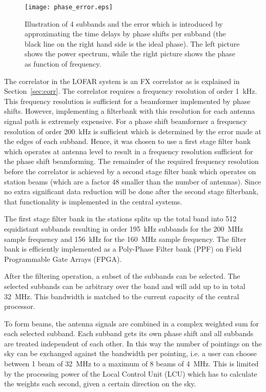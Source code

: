 \documentclass[journal]{IEEEtran}
\begin{document}
\begin{figure}
\begin{center}
\texttt{[image: phase\_error.eps]}
\end{center}
\caption{Illustration of 4 subbands and the error which is introduced by approximating the time delays by phase shifts per subband (the black line on the right hand side is the ideal phase). The left picture shows the power spectrum, while the right picture shows the phase as function of frequency.}
\label{fig:phasebeamf}
\end{figure}

The correlator in the LOFAR system is an FX correlator as is explained in Section~\ref{sec:corr}. The correlator requires a frequency resolution of order 1~kHz. This frequency resolution is sufficient for a beamformer implemented by phase shifts. However, implementing a filterbank with this resolution for each antenna signal path is extremely expensive. For a phase shift beamformer a frequency resolution of order 200~kHz is sufficient which is determined by the error made at the edges of each subband. Hence, it was chosen to use a first stage filter bank which operates at antenna level to result in a frequency resolution sufficient for the phase shift beamforming. The remainder of the required frequency resolution before the correlator is achieved by a second stage filter bank which operates on station beams (which are a factor 48 smaller than the number of antennas). Since no extra significant data reduction will be done after the second stage filterbank, that functionality is implemented in the central systems.

The first stage filter bank in the stations splits up the total band into 512 equidistant subbands resulting in order 195~kHz subbands for the 200~MHz sample frequency and 156~kHz for the 160~MHz sample frequency. The filter bank is efficiently implemented as a Poly-Phase Filter bank (PPF) on Field Programmable Gate Arrays (FPGA).

After the filtering operation, a subset of the subbands can be selected. The selected subbands can be arbitrary over the band and will add up to in total 32~MHz. This bandwidth is matched to the current capacity of the central processor.

To form beams, the antenna signals are combined in a complex weighted sum for each selected subband. Each subband gets its own phase shift and all subbands are treated independent of each other. In this way the number of pointings on the sky can be exchanged against the bandwidth per pointing, i.e. a user can choose between 1 beam of 32~MHz to a maximum of 8 beams of 4~MHz. This is limited by the processing power of the Local Control Unit (LCU) which has to calculate the weights each second, given a certain direction on the sky. 
\end{document}
